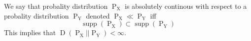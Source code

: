 We say that probality distribution $\operatorname{P}_{\operatorname{X}}$ is absolutely continous with respect to a probality distribution $\operatorname{P}_{\operatorname{Y}}$ denoted $\operatorname{P}_{\operatorname{X}} \ll \operatorname{P}_{\operatorname{Y}}$ iff
$$\operatorname{supp}(\operatorname{P}_{\operatorname{X}}) \subset \operatorname{supp}(\operatorname{P}_{\operatorname{Y}})$$
This implies that $\operatorname{D}(\operatorname{P}_{\operatorname{X}} || \operatorname{P}_{\operatorname{Y}}) < \infty$.
